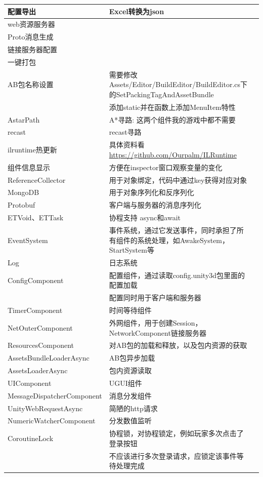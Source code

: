\documentclass[9pt, b5paper]{article}
\begin{document}
\begin{center}
\begin{tabular}{lll}
\hline
配置导出 & Excel转换为json & \\
\hline
web资源服务器 &  & \\
Proto消息生成 &  & \\
链接服务器配置 &  & \\
一键打包 &  & \\
\hline
AB包名称设置 & 需要修改Assets/Editor/BuildEditor/BuildEditor.cs下的SetPackingTagAndAssetBundle & \\
 & 添加static并在函数上添加MenuItem特性 & \\
\hline
AstarPath & A*寻路: 这两个组件我的游戏中都不需要 & \\
recast & recast寻路 & \\
\hline
ilruntime热更新 & 具体资料看\url{https://github.com/Ourpalm/ILRuntime} & \\
组件信息显示 & 方便在inspector窗口观察变量的变化 & \\
ReferenceCollector & 用于对象绑定，代码中通过key获得对应对象 & \\
MongoDB & 用于对象序列化和反序列化 & \\
Protobuf & 客户端与服务器的消息序列化 & \\
\hline
ETVoid、ETTask & 协程支持 async和await & \\
EventSystem & 事件系统，通过它发送事件，同时承担了所有组件的系统处理，如AwakeSystem，StartSystem等 & \\
Log & 日志系统 & \\
ConfigComponent & 配置组件，通过读取config.unity3d包里面的配置加载 & \\
 & 配置同时用于客户端和服务器 & \\
TimerComponent & 时间等待组件 & \\
NetOuterComponent & 外网组件，用于创建Session，NetworkComponent链接服务器 & \\
\hline
ResourcesComponent & 对AB包的加载和释放，以及包内资源的获取 & \\
AssetsBundleLoaderAsync & AB包异步加载 & \\
AssetsLoaderAsync & 包内资源读取 & \\
\hline
UIComponent & UGUI组件 & \\
MessageDispatcherComponent & 消息分发组件 & \\
UnityWebRequestAsync & 简陋的http请求 & \\
NumericWatcherComponent & 分发数值监听 & \\
\hline
CoroutineLock & 协程锁，对协程锁定，例如玩家多次点击了登录按钮 & \\
 & 不应该进行多次登录请求，应锁定该事件等待处理完成 & \\
\hline
\end{tabular}
\end{center}
\end{document}

